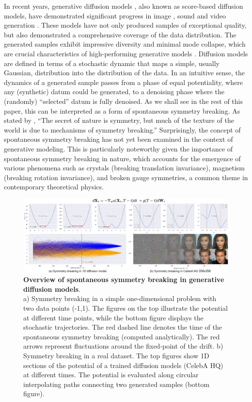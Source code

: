 \documentclass{article}
\begin{document}
In recent years, generative diffusion models \citep{sohl2015deep}, also known as score-based diffusion models, have demonstrated significant progress in image  \citep{ho2020denoising, song2021scorebased}, sound \citep{chen2020wavegrad, kong2020diffwave, liu2023audioldm} and video generation \citep{ho2022video, singer2022make}. These models have not only produced samples of exceptional quality, but also demonstrated a comprehensive coverage of the data distribution. The generated samples exhibit impressive diversity and minimal mode collapse, which are crucial characteristics of high-performing generative models \citep{salimans2016improved, lucic2018gans, thanh2020catastrophic}. Diffusion models are defined in terms of a stochastic dynamic that maps a simple, usually Gaussian, distribution into the distribution of the data. In an intuitive sense, the dynamics of a generated sample passes from a phase of equal potentiality, where any (synthetic) datum could be generated, to a denoising phase where the (randomly) ``selected'' datum is fully denoised. As we shall see in the rest of this paper, this can be interpreted as a form of spontaneous symmetry breaking. As stated by \citet{gross1996role}, ``The secret of nature is symmetry, but much of the texture of the world is due to mechanisms of symmetry breaking.'' Surprisingly, the concept of spontaneous symmetry breaking has not yet been examined in the context of generative modeling. This is particularly noteworthy given the importance of spontaneous symmetry breaking in nature, which accounts for the emergence of various phenomena such as crystals (breaking translation invariance), magnetism (breaking rotation invariance), and broken gauge symmetries, a common theme in contemporary theoretical physics.
 
\begin{figure}
    \centering
    \includegraphics[width=\textwidth]{figs/imgs/main_image_hq.jpg}
    \caption{\textbf{Overview of spontaneous symmetry breaking in generative diffusion models}. \\a) Symmetry breaking in a simple one-dimensional problem with two data points (-1,1). The figures on the top illustrate the potential at different time points, while the bottom figure displays the stochastic trajectories. The red dashed line denotes the time of the spontaneous symmetry breaking (computed analytically). The red arrows represent fluctuations around the fixed-point of the drift. b) Symmetry breaking in a real dataset. The top figures show 1D sections of the potential of a trained diffusion models (CelebA HQ) at different times. The potential is evaluated along circular interpolating paths connecting two generated samples (bottom figure).}
    \label{fig:main_image}
\end{figure}
 
\end{document}
